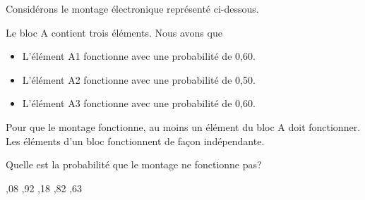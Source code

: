 \begin{questions}
\question[3]\label{probaQCM} Considérons le montage électronique représenté ci-dessous.
	
\begin{figure}[h!]
    \label{fig:montage}
    \begin{center}	 \end{center}
\end{figure}
	
 Le bloc A contient trois éléments. Nous avons que
\begin{itemize}
    \item L'élément A1 fonctionne avec une probabilité de 0,60.
    \item L'élément A2 fonctionne avec une probabilité de 0,50.
    \item L'élément A3 fonctionne avec une probabilité de 0,60.
\end{itemize}
Pour que le montage fonctionne, au moins un élément du bloc A doit fonctionner. Les éléments d'un bloc fonctionnent de façon indépendante.
	
\vspace{0,3cm}

 Quelle est la probabilité que le montage ne fonctionne pas? 


 \begin{oneparcheckboxes}
		,08
		,92
		,18 
		,82
		,63
\end{oneparcheckboxes}


\end{questions}
